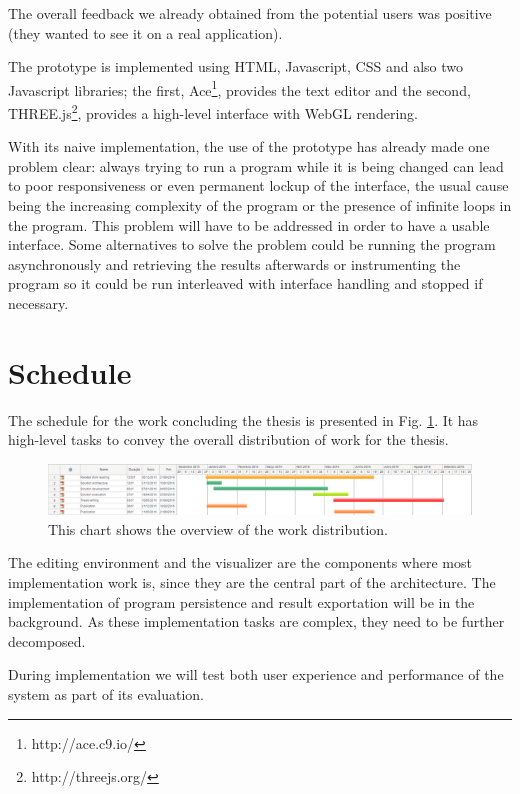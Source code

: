 \documentclass{./llncs2e/llncs}
\begin{document}
	The overall feedback we already obtained from the potential users was positive (they wanted to see it on a real application).

	The prototype is implemented using HTML, Javascript, CSS and also two Javascript libraries; the first, Ace\footnote{http://ace.c9.io/}, provides the text editor and the second, THREE.js\footnote{http://threejs.org/}, provides a high-level interface with WebGL rendering.

	With its naive implementation, the use of the prototype has already made one problem clear: always trying to run a program while it is being changed can lead to poor responsiveness or even permanent lockup of the interface, the usual cause being the increasing complexity of the program or the presence of infinite loops in the program. 
	This problem will have to be addressed in order to have a usable interface. 
	Some alternatives to solve the problem could be running the program asynchronously and retrieving the results afterwards or instrumenting the program so it could be run interleaved with interface handling and stopped if necessary.

\section{Schedule}
	The schedule for the work concluding the thesis is presented in Fig. \ref{fig:schedule}.
	It has high-level tasks to convey the overall distribution of work for the thesis.
	
	\begin{figure}
		\centering
		\includegraphics[width=1.0\textwidth]{img/schedule}
		\caption{This chart shows the overview of the work distribution.}
		\label{fig:schedule}
	\end{figure}
	
	The editing environment and the visualizer are the components where most implementation work is, since they are the central part of the architecture.
	The implementation of program persistence and result exportation will be in the background.
	As these implementation tasks are complex, they need to be further decomposed.
	
	During implementation we will test both user experience and performance of the system as part of its evaluation.
	
\end{document}
